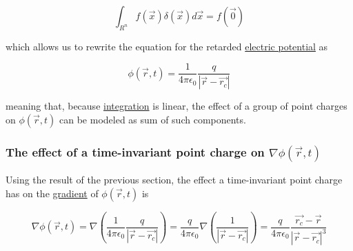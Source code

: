 ﻿\documentclass{article}
\begin{document}
$$\int_{R^n} f(\vec{x}) \delta(\vec{x}) d\vec{x} = f(\vec{0})$$

which allows us to rewrite the equation for the retarded \href{https://en.wikipedia.org/wiki/Electric_potential}{electric potential} as

$$\phi(\vec{r}, t) = \frac{1}{4 \pi \epsilon_0} \frac{q}{|\vec{r} - \vec{r_c}|}$$

meaning that, because \href{https://en.wikipedia.org/wiki/Integral}{integration} is linear, the effect of a group of point charges on $\phi(\vec{r}, t)$ can be modeled as sum of such components.

\subsubsection{The effect of a time-invariant point charge on $\nabla \phi(\vec{r}, t)$}

Using the result of the previous section, the effect a time-invariant point charge has on the \href{https://en.wikipedia.org/wiki/Gradient}{gradient} of $\phi(\vec{r}, t)$ is

$$\nabla \phi(\vec{r}, t) = \nabla \left( \frac{1}{4 \pi \epsilon_0} \frac{q}{|\vec{r} - \vec{r_c}|} \right) = \frac{q}{4 \pi \epsilon_0} \nabla \left( \frac{1}{|\vec{r} - \vec{r_c}|} \right) = \frac{q}{4 \pi \epsilon_0} \frac{\vec{r_c} - \vec{r}}{|\vec{r} - \vec{r_c}|^3}$$
\end{document}
